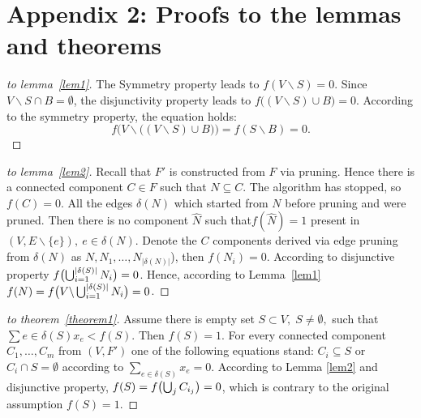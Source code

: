 \documentclass[12pt]{article}
\newtheorem{proof}{Proof}
\begin{document}
\section*{Appendix 2: Proofs to the lemmas and theorems}

\begin{proof}[to lemma~\ref{lem1}]
    The Symmetry property leads to $f (V\backslash S) = 0$. Since $V\backslash S \cap B = \emptyset$, the disjunctivity property leads to $f \big((V\backslash S)\cup B\big) = 0$. According to the symmetry property, the  equation holds:  \[f\Big( V\backslash \big((V\backslash S)\cup B\big)\Big) = f(S\backslash B) = 0. \]
\end{proof}
\begin{proof}[to lemma~\ref{lem2}]
    Recall that $F'$ is constructed from $F$ via pruning. Hence there is a connected component $C\in F$ such that $N\subseteq C$. The algorithm has stopped, so $f(C) = 0$. All the edges $\delta(N)$ which started from $N$ before pruning and were pruned. Then there is no component $\hat{N}$ such that$f(\hat{N})=1$ present in $(V, E\backslash\{e\}),~e\in\delta(N)$.
    Denote the $C$ components derived via edge pruning from $\delta(N)$ as $N,N_1,\ldots,N_{|\delta(N)|}$), then $f(N_i) = 0$. According to disjunctive property $f\bigl(\bigcup_{i=1}^{|\delta(S)|} N_i\bigr) = 0$. Hence, according to Lemma~\ref{lem1}  $f(N) = f\bigl( V\backslash\bigcup_{i=1}^{|\delta(S)|} N_i\bigr) = 0$.
\end{proof}
\begin{proof}[to theorem~\ref{theorem1}]
    Assume there is empty set $S \subset V, \; S \not= \emptyset,$ such that $\sum{e\in \delta(S)}x_e < f(S)$.
    Then $f(S) = 1$. For every connected component $C_1,\ldots,C_m$ from $(V,F')$ one of the following equations stand:
    $C_i\subseteq S$ or $C_i\cap S = \emptyset$ according to $\sum_{e\in \delta(S)}x_e=0$.
    According to Lemma \ref{lem2} and disjunctive property, $f(S) = f\bigl(\bigcup_{j}C_{i_j}\bigr) = 0$, which is contrary to the original assumption $f(S) = 1$.
\end{proof}
\end{document}
